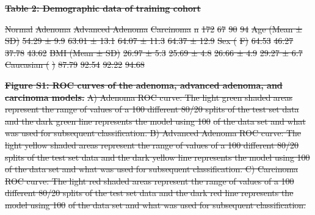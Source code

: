 \documentclass[12pt,]{article}
\providecommand{\DIFdeltex}[1]{{\protect\color{red}\sout{#1}}}                      %
\providecommand{\DIFdel}[1]{\texorpdfstring{\DIFdeltex{#1}}{}} %
\begin{document}

\textbf{\DIFdel{Table 2: Demographic data of training cohort}}

\DIFdel{Normal }%
\DIFdel{Adenoma }%
\DIFdel{Advanced Adenoma }%
\DIFdel{Carcinoma}%
\DIFdel{n }%
\DIFdel{172 }%
\DIFdel{67 }%
\DIFdel{90 }%
\DIFdel{94}%
\DIFdel{Age (Mean ± SD) }%
\DIFdel{54.29 ± 9.9 }%
\DIFdel{63.01 ± 13.1 }%
\DIFdel{64.07 ± 11.3 }%
\DIFdel{64.37 ±
12.9}%
\DIFdel{Sex (}%
\DIFdel{F) }%
\DIFdel{64.53 }%
\DIFdel{46.27 }%
\DIFdel{37.78 }%
\DIFdel{43.62}%
\DIFdel{BMI (Mean ± SD) }%
\DIFdel{26.97 ± 5.3 }%
\DIFdel{25.69 ± 4.8 }%
\DIFdel{26.66 ± 4.9 }%
\DIFdel{29.27 ±
6.7}%
\DIFdel{Caucasian (}%
\DIFdel{) }%
\DIFdel{87.79 }%
\DIFdel{92.54 }%
\DIFdel{92.22 }%
\DIFdel{94.68}%


\textbf{\DIFdel{Figure S1: ROC curves of the adenoma, advanced adenoma, and
carcinoma models.}} %
\DIFdel{A) Adenoma ROC curve: The light green shaded areas
represent the range of values of a 100 different 80/20 splits of the
test set data and the dark green line represents the model using 100}%
\DIFdel{of the data set and what was used for subsequent classification. B)
Advanced Adenoma ROC curve: The light yellow shaded areas represent the
range of values of a 100 different 80/20 splits of the test set data and
the dark yellow line represents the model using 100}%
\DIFdel{of the data set
and what was used for subsequent classification. C) Carcinoma ROC curve:
The light red shaded areas represent the range of values of a 100
different 80/20 splits of the test set data and the dark red line
represents the model using 100}%
\DIFdel{of the data set and what was used for
subsequent classification.
}%
\end{document}
